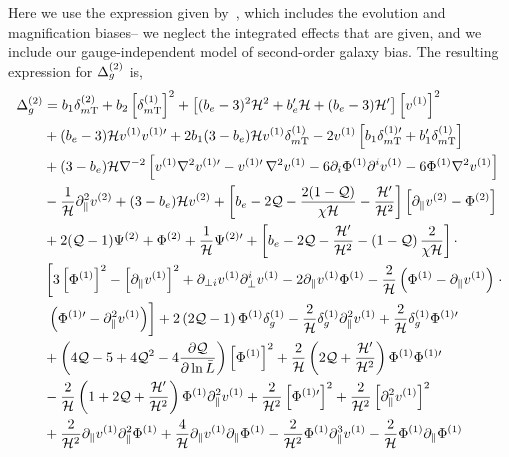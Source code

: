 Here we use the expression given by~\cite{Bertacca:2014hwa}, which includes the evolution and magnification biases-- we neglect the integrated effects that are given, and we include our gauge-independent model of second-order galaxy bias. The resulting expression for $\Delta_g^{(2)}$ is, 
\begin{align} 
\Delta_{g}^{(2)} &= b_1 \delta_{m{\mathrm{T}}}^\tw + b_2 \left[\delta_{m{\mathrm{T}}}^\on \right]^2 + \left[(b_e-3)^2 \cH^2 + b_e' \cH +(b_e-3) \cH' \right] \left[v^\on \right]^2 \nonumber \\
& + (b_e - 3)\cH v^\on v^{\on \prime} + 2b_1 (3 - b_e) \cH v^\on \delta_{m\mathrm{T}}^{(1)} - 2v^\on \left[ b_1 \delta_{m\mathrm{T}}^{\on \prime} + b_1' \delta_{m\mathrm{T}}^\on \right] \nonumber \\
&+ (3-b_{e})\cH \nabla^{-2} \left[v^\on \nabla^2 v^{\on \prime} - v^{\on \prime} \, \nabla^2 v^\on  - 6 \partial_{i}\Phi^\on \partial^{i}v^\on - 6 \Phi^\on \nabla^2 v^\on \right] \nonumber \\
&- \frac{1}{\cH} \partial_\parallel^2 v^\tw + (3-b_e) \cH v^\tw + \left[b_{e} - 2\mathcal{Q} -\frac{2(1-\mathcal{Q})}{\chi\mathcal{H}}- \frac{\mathcal{H}'}{\mathcal{H}^{2}} \right] \left[\partial_\parallel v^\tw - \Phi^\tw \right] \nonumber \\
& + 2(\Q - 1) \Psi^\tw + \Phi^\tw + \frac{1}{\cH} \Psi^{\tw\prime} + \left[ b_e-2 \Q - \frac{\cH'}{\cH^2} - \left(1 - \Q\right) \frac{2}{\chi \cH} \right] \cdot \nonumber \\
& \left[ 3 \left[{\Phi}^{(1)}\right]^2 - \left[ \p_\| v^\on \right]^2 + \p_{\perp i} v^\on \p^i_\perp v^\on - 2 \p_\| v^\on \Phi^\on - \frac{2}{\cH} \left( \Phi^\on - \p_\| v^\on \right) \right. \cdot \nonumber \\
& \left. \vphantom{\frac{1}{\cH}} \left( \Phi^{(1)\prime} - \p_\|^2 v^\on  \right)\right] +2 \left(2 \Q-1 \right) \Phi^\on \delta_g^\on - \frac{2}{\cH} \delta_g^\on \p_\|^2 v^\on +\frac{2}{\cH}\delta_g^\on \Phi^{\on \prime} \nonumber \\
& + \left( 4 \Q -5 + 4 \Q^2 - 4 \frac{\p \Q}{\p \ln \bar L} \right) \left[ \Phi^\on \right]^2 + \frac{2}{\cH} \left( 2\Q + \frac{\cH'}{\cH^2} \right) \Phi^\on \Phi^{\on \prime} \nonumber \\
& - \frac{2}{\cH} \left( 1+ 2\Q  +\frac{\cH'}{\cH^2} \right) \Phi^\on \p_\|^2 v^\on + \frac{2}{\cH^2} \left[ \Phi^{\on \prime}  \right]^2 + \frac{2}{\cH^2}\left[\p_\|^2 v^\on  \right]^2  \nonumber \\
& + \frac{2}{\cH^2} \p_\| v^{(1)}  \p_\|^2 \Phi^\on +\frac{4}{\cH}\p_\| v^\on\p_\| \Phi^\on - \frac{2}{\cH^2} \Phi^\on \p_\|^3 v^\on - \frac{2}{\cH} \Phi^\on \p_\| \Phi^\on \nonumber \\

\end{align}
